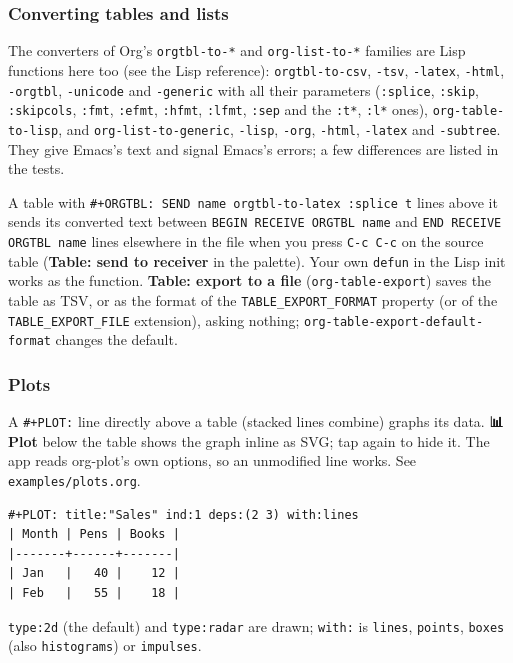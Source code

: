 \documentclass[11pt]{article}
\begin{document}
\subsubsection{Converting tables and lists}
\label{sec:org5669993}
The converters of Org's \texttt{orgtbl-to-*} and \texttt{org-list-to-*} families are Lisp functions here too (see the Lisp reference): \texttt{orgtbl-to-csv}, \texttt{-tsv}, \texttt{-latex}, \texttt{-html}, \texttt{-orgtbl}, \texttt{-unicode} and \texttt{-generic} with all their parameters (\texttt{:splice}, \texttt{:skip}, \texttt{:skipcols}, \texttt{:fmt}, \texttt{:efmt}, \texttt{:hfmt}, \texttt{:lfmt}, \texttt{:sep} and the \texttt{:t*}, \texttt{:l*} ones), \texttt{org-table-to-lisp}, and \texttt{org-list-to-generic}, \texttt{-lisp}, \texttt{-org}, \texttt{-html}, \texttt{-latex} and \texttt{-subtree}. They give Emacs's text and signal Emacs's errors; a few differences are listed in the tests.

A table with \texttt{\#+ORGTBL: SEND name orgtbl-to-latex :splice t} lines above it sends its converted text between \texttt{BEGIN RECEIVE ORGTBL name} and \texttt{END RECEIVE ORGTBL name} lines elsewhere in the file when you press \texttt{C-c C-c} on the source table (\textbf{Table: send to receiver} in the palette). Your own \texttt{defun} in the Lisp init works as the function. \textbf{Table: export to a file} (\texttt{org-table-export}) saves the table as TSV, or as the format of the \texttt{TABLE\_EXPORT\_FORMAT} property (or of the \texttt{TABLE\_EXPORT\_FILE} extension), asking nothing; \texttt{org-table-export-default-format} changes the default.

\subsubsection{Plots}
\label{sec:org8cef013}
A \texttt{\#+PLOT:} line directly above a table (stacked lines combine) graphs its data. \textbf{📊 Plot} below the table shows the graph inline as SVG; tap again to hide it. The app reads org-plot's own options, so an unmodified line works. See \texttt{examples/plots.org}.

\begin{verbatim}
#+PLOT: title:"Sales" ind:1 deps:(2 3) with:lines
| Month | Pens | Books |
|-------+------+-------|
| Jan   |   40 |    12 |
| Feb   |   55 |    18 |
\end{verbatim}

\texttt{type:2d} (the default) and \texttt{type:radar} are drawn; \texttt{with:} is \texttt{lines}, \texttt{points}, \texttt{boxes} (also \texttt{histograms}) or \texttt{impulses}.
\end{document}
